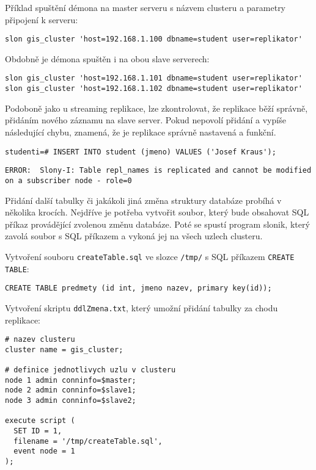 Příklad spuštění démona na master serveru s názvem clusteru a parametry připojení k serveru:
\begin{lstlisting}
slon gis_cluster 'host=192.168.1.100 dbname=student user=replikator'
\end{lstlisting}
Obdobně je démona spuštěn i na obou slave serverech:
\begin{lstlisting}
slon gis_cluster 'host=192.168.1.101 dbname=student user=replikator'
slon gis_cluster 'host=192.168.1.102 dbname=student user=replikator'
\end{lstlisting}

Podoboně jako u streaming replikace, lze zkontrolovat, že replikace běží správně, přidáním nového záznamu na slave server. Pokud nepovolí přidání a vypíše následující chybu, znamená, že je replikace správně nastavená a funkční.

\begin{lstlisting}
studenti=# INSERT INTO student (jmeno) VALUES ('Josef Kraus');
\end{lstlisting}
\begin{lstlisting}[identifierstyle=\color{black},stringstyle=\color{black},keywordstyle=\color{black}]
ERROR:  Slony-I: Table repl_names is replicated and cannot be modified on a subscriber node - role=0
\end{lstlisting}

Přidání další tabulky či jakákoli jiná změna struktury databáze probíhá v několika krocích. Nejdříve je potřeba vytvořit soubor, který bude obsahovat SQL příkaz provádějící zvolenou změnu databáze. Poté se spustí program slonik, který zavolá soubor s SQL příkazem a vykoná jej na všech uzlech clusteru. 

Vytvoření souboru \texttt{createTable.sql} ve slozce \texttt{/tmp/} s SQL příkazem \texttt{CREATE TABLE}:

\begin{lstlisting}
CREATE TABLE predmety (id int, jmeno nazev, primary key(id));
\end{lstlisting}

Vytvoření skriptu \texttt{ddlZmena.txt}, který umožní přidání tabulky za chodu replikace:

\begin{lstlisting}[identifierstyle=\color{black},stringstyle=\color{black},keywordstyle=\color{black}]
# nazev clusteru
cluster name = gis_cluster;

# definice jednotlivych uzlu v clusteru
node 1 admin conninfo=$master;
node 2 admin conninfo=$slave1;
node 3 admin conninfo=$slave2;

execute script (
  SET ID = 1,
  filename = '/tmp/createTable.sql',
  event node = 1
);

\end{lstlisting}

